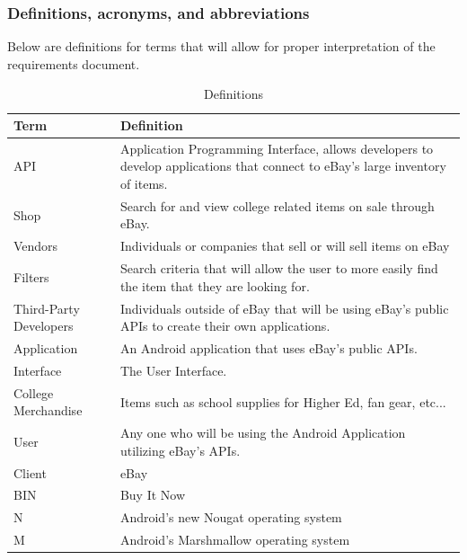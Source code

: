 \documentclass[journal,compsoc, 10pt, draftclsnofoot, onecolumn]{IEEEtran}
\begin{document}
\subsubsection{Definitions, acronyms, and abbreviations}

Below are definitions for terms that will allow for proper interpretation of the
 requirements document.

\begin{table}[!h]
\centering
\caption{Definitions}
\label{Definition table}
\begin{tabularx}{\textwidth}{l|X}
\hline
\textbf{Term}               & \textbf{Definition}   \\ \hline
API                    	      & Application Programming Interface, allows developers to
 develop applications that connect to eBay's large inventory of items. \\ \hline
Shop                   	      & Search for and view college related items on sale 
through eBay. \\ \hline
Vendors               	      & Individuals or companies that sell or will sell items on 
eBay\\ \hline
Filters                	      & Search criteria that will allow the user to more easily 
find the item that they are looking for. \\ \hline
Third-Party Developers & Individuals outside of eBay that will be using eBay's public 
APIs to create their own applications.\\ \hline
Application            	      & An Android application that uses eBay's public 
APIs. \\ \hline
Interface              	      & The User Interface.\\ \hline
College Merchandise     & Items such as school supplies for Higher Ed, fan gear, 
etc...   \\ \hline
User                   	      & Any one who will be using the Android Application 
utilizing eBay's APIs.\\ \hline
Client                 	      & eBay  \\ \hline
BIN                    	      & Buy It Now      \\ \hline
N                   	      & Android's new Nougat operating system 
\\ \hline
M                   	      & Android's Marshmallow operating system\\ \hline
\end{tabularx}
\end{table}
\end{document}
